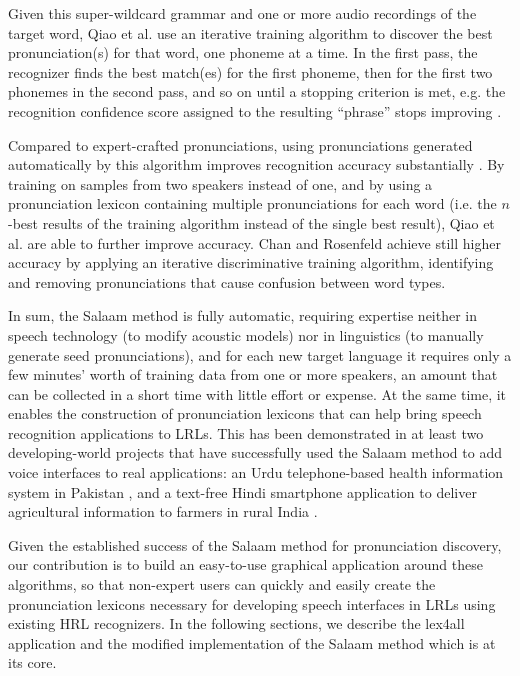 \documentclass[11pt]{article}
\begin{document}
Given this super-wildcard grammar and one or more audio recordings of the target word, Qiao et al. \cite[§4.1]{Qiao10} use an iterative training algorithm to discover the best pronunciation(s) for that word, one phoneme at a time. 
In the first pass, the recognizer finds the best match(es) for the first phoneme, then for the first two phonemes in the second pass, and so on until a stopping criterion is met, e.g. the recognition confidence score assigned to the resulting ``phrase'' stops improving \cite[p.~4]{Qiao10}.

Compared to expert-crafted pronunciations, using pronunciations generated automatically by this algorithm improves recognition accuracy substantially \cite[§5.2]{Qiao10}. By training on samples from two speakers instead of one, and by using a pronunciation lexicon containing multiple pronunciations for each word (i.e. the $n$-best results of the training algorithm instead of the single best result), Qiao et al. are able to further improve accuracy. Chan and Rosenfeld \cite{Chan12} achieve still higher accuracy by applying an iterative discriminative training algorithm, identifying and removing pronunciations that cause confusion between word types.

In sum, the Salaam method is fully automatic, requiring expertise neither in speech technology (to modify acoustic models) nor in linguistics (to manually generate seed pronunciations), and for each new target language it requires only a few minutes' worth of training data from one or more speakers, an amount that can be collected in a short time with little effort or expense. At the same time, it enables the construction of pronunciation lexicons that can help bring speech recognition applications to LRLs. This has been demonstrated in at least two developing-world projects that have successfully used the Salaam method to add voice interfaces to real applications: an Urdu telephone-based health information system in Pakistan \cite{Sherwani09}, and a text-free Hindi smartphone application to deliver agricultural information to farmers in rural India \cite{bali13}.


Given the established success of the Salaam method for pronunciation discovery, our contribution is to build an easy-to-use graphical application around these algorithms, so that non-expert users can quickly and easily create the pronunciation lexicons necessary for developing speech interfaces in LRLs using existing HRL recognizers. In the following sections, we describe the lex4all application and the modified implementation of the Salaam method which is at its core.
\end{document}
